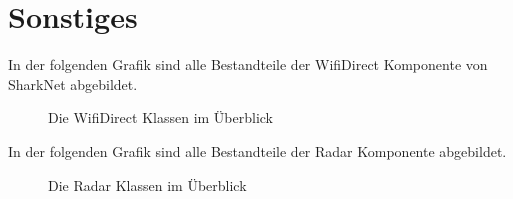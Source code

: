 \documentclass[german, 12pt]{book}
\begin{document}
\chapter{Sonstiges}
In der folgenden Grafik sind alle Bestandteile der WifiDirect Komponente von SharkNet abgebildet.
\begin{figure}[H]
	\centering
	\hspace*{1cm}
	\caption{Die WifiDirect Klassen im Überblick}
	\label{fig:wifiAll}
\end{figure}

\newpage

In der folgenden Grafik sind alle Bestandteile der Radar Komponente abgebildet.
\begin{figure}[H]
	\centering
	\hspace*{1cm}
	\caption{Die Radar Klassen im Überblick}
	\label{fig:radarAll}
\end{figure}
\end{document}
